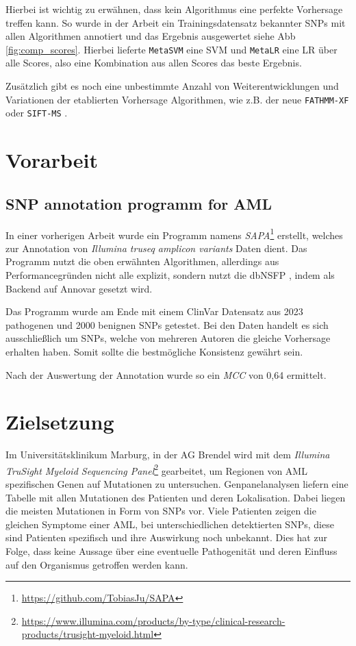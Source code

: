 Hierbei ist wichtig zu erwähnen, dass kein Algorithmus eine perfekte Vorhersage treffen kann. So wurde in der Arbeit \cite{Liu.2016} ein Trainingsdatensatz bekannter SNPs mit allen Algorithmen annotiert und das Ergebnis ausgewertet siehe \ac{Abb} \ref{fig:comp_scores}. Hierbei lieferte \texttt{MetaSVM} eine \ac{SVM} und \texttt{MetaLR} eine \ac{LR} über alle Scores, also eine Kombination aus allen Scores das beste Ergebnis.


Zusätzlich gibt es noch eine unbestimmte Anzahl von Weiterentwicklungen und Variationen der etablierten Vorhersage Algorithmen, wie z.B. der neue \texttt{FATHMM-XF} \cite{Rogers.2017} oder \texttt{SIFT-MS} \cite{Smith.2015}.



\section{Vorarbeit}
\subsection{SNP annotation programm for AML}
\label{sec:sapa}
In einer vorherigen Arbeit wurde ein Programm namens \emph{SAPA}\footnote{\url{https://github.com/TobiasJu/SAPA}} erstellt, welches zur Annotation von \emph{Illumina truseq amplicon variants} Daten dient. Das Programm nutzt die oben erwähnten Algorithmen, allerdings aus Performancegründen nicht alle explizit, sondern nutzt die dbNSFP \cite{Liu.2016}, indem als Backend auf Annovar \cite{Wang.2010} gesetzt wird. 

Das Programm wurde am Ende mit einem ClinVar Datensatz aus 2023 pathogenen und 2000 benignen \ac{SNP}s getestet. Bei den Daten handelt es sich ausschließlich um \ac{SNP}s, welche von mehreren Autoren die gleiche Vorhersage erhalten haben. Somit sollte die bestmögliche Konsistenz gewährt sein.

Nach der Auswertung der Annotation wurde so ein \emph{MCC} von 0,64 ermittelt.


\section{Zielsetzung}

Im Universitätsklinikum Marburg, in der AG Brendel wird mit dem \emph{Illumina TruSight Myeloid Sequencing Panel}\footnote{\url{https://www.illumina.com/products/by-type/clinical-research-products/trusight-myeloid.html}} gearbeitet, um Regionen von \ac{AML} spezifischen Genen auf Mutationen zu untersuchen. Genpanelanalysen liefern eine Tabelle mit allen Mutationen des Patienten und deren Lokalisation. Dabei liegen die meisten Mutationen in Form von \ac{SNP}s vor. Viele Patienten zeigen die gleichen Symptome einer \ac{AML}, bei unterschiedlichen detektierten \ac{SNP}s, diese sind Patienten spezifisch und ihre Auswirkung noch unbekannt. Dies hat zur Folge, dass keine Aussage über eine eventuelle Pathogenität und deren Einfluss auf den Organismus getroffen werden kann.

